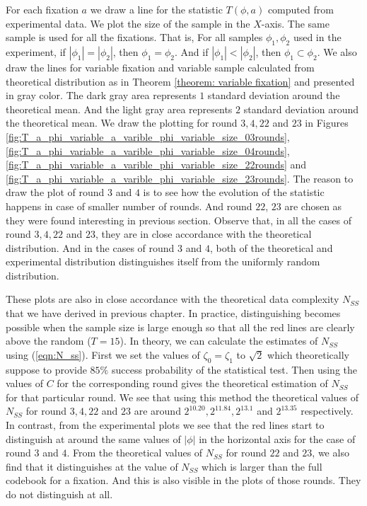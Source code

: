 \par \noindent For each fixation $a$ we draw a line for the statistic $T\left(\phi,a\right)$ computed from experimental data. We plot the size of the sample in the $X$-axis. The same sample is used for all the fixations. That is, For all samples $\phi_1,\phi_2$ used in the experiment, if $|\phi_1| = |\phi_2|$, then $\phi_1 = \phi_2$. And if $|\phi_1| < |\phi_2|$, then $\phi_1 \subset \phi_2$. We also draw the lines for variable fixation and variable sample calculated from theoretical distribution as in Theorem \ref{theorem: variable fixation} and presented in gray color. The dark gray area represents $1$ standard deviation around the theoretical mean. And the light gray area represents $2$ standard deviation around the theoretical mean. We draw the plotting for round $3,4,22$ and $23$ in Figures \ref{fig:T_a_phi_variable_a_varible_phi_variable_size_03rounds}, \ref{fig:T_a_phi_variable_a_varible_phi_variable_size_04rounds},\ref{fig:T_a_phi_variable_a_varible_phi_variable_size_22rounds} and \ref{fig:T_a_phi_variable_a_varible_phi_variable_size_23rounds}. The reason to draw the plot of round $3$ and $4$ is to see how the evolution of the statistic happens in case of smaller number of rounds. And round $22$, $23$ are chosen as they were found interesting in previous section. Observe that, in all the cases of round $3,4,22$ and $23$, they are in close accordance with the theoretical distribution. And in the cases of round $3$ and $4$, both of the theoretical and experimental distribution distinguishes itself from the uniformly random distribution. \par \noindent These plots are also in close accordance with the theoretical data complexity $N_{SS}$ that we have derived in previous chapter. In practice, distinguishing becomes possible when the sample size is large enough so that all the red lines are clearly above the random ($T = 15$). In theory, we can calculate the estimates of $N_{SS}$ using (\ref{eqn:N_ss}). First we set the values of $\zeta_0 = \zeta_1$ to  $\sqrt{2}$ which theoretically suppose to provide $85\%$ success probability of the statistical test. Then using the values of $C$ for the corresponding round gives the theoretical estimation of $N_{SS}$ for that particular round. We see that using this method the theoretical values of $N_{SS}$ for round $3,4,22$ and $23$ are around $2^{10.20},2^{11.84},2^{13.1}$ and $2^{13.35}$ respectively. In contrast, from the experimental plots we see that the red lines start to distinguish at around the same values of $|\phi|$ in the horizontal axis for the case of round $3$ and $4$. From the theoretical values of $N_{SS}$ for round $22$ and $23$, we also find that it distinguishes at the value of $N_{SS}$ which is larger than the full codebook for a fixation. And this is also visible in the plots of those rounds. They do not distinguish at all.

